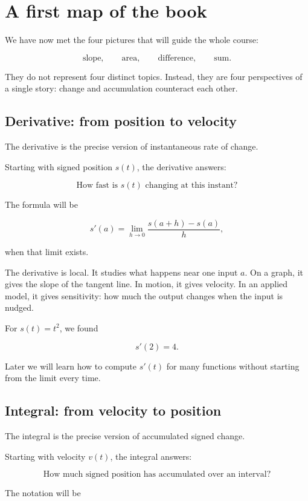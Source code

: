 \section{A first map of the book}
\label{sec:first-map}

We have now met the four pictures that will guide the whole course:

\[
\text{slope},\qquad
\text{area},\qquad
\text{difference},\qquad
\text{sum}.
\]

They do not represent four distinct topics. Instead, they are four perspectives of a single story: change and accumulation counteract each other.

\subsection{Derivative: from position to velocity}

The derivative is the precise version of instantaneous rate of change.

Starting with signed position \(s(t)\), the derivative answers:

\[
\text{How fast is }s(t)\text{ changing at this instant?}
\]

The formula will be

\[
s'(a)=\lim_{h\to0}\frac{s(a+h)-s(a)}{h},
\]

when that limit exists.

The derivative is local. It studies what happens near one input \(a\). On a graph, it gives the slope of the tangent line. In motion, it gives velocity. In an applied model, it gives sensitivity: how much the output changes when the input is nudged.

For \(s(t)=t^2\), we found

\[
s'(2)=4.
\]

Later we will learn how to compute \(s'(t)\) for many functions without starting from the limit every time.

\subsection{Integral: from velocity to position}

The integral is the precise version of accumulated signed change.

Starting with velocity \(v(t)\), the integral answers:

\[
\text{How much signed position has accumulated over an interval?}
\]

The notation will be

